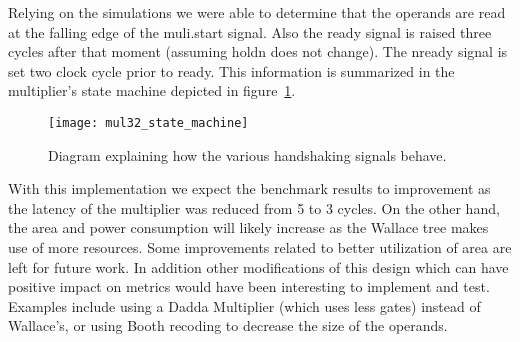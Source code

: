 Relying on the simulations we were able to determine that the operands are read at the falling edge of the muli.start signal. Also the ready signal is raised three cycles after that moment (assuming holdn does not change). The nready signal is set two clock cycle prior to ready.
This information is summarized in the multiplier's state machine depicted in figure~\ref{fig:mul32_state_machine}.

\begin{figure}[H]
\centering
\texttt{[image: mul32\_state\_machine]}
\caption{Diagram explaining how the various handshaking signals behave.}
\label{fig:mul32_state_machine}
\end{figure}



With this implementation we expect the benchmark results to improvement as the latency of the multiplier was reduced from 5 to 3 cycles. On the other hand, the area and power consumption will likely increase as the Wallace tree makes use of more resources. Some improvements related to better utilization of area are left for future work. In addition other modifications of this design which can have positive impact on metrics would have been interesting to implement and test. Examples include using a Dadda Multiplier (which uses less gates) instead of Wallace's, or using Booth recoding to decrease the size of the operands.


